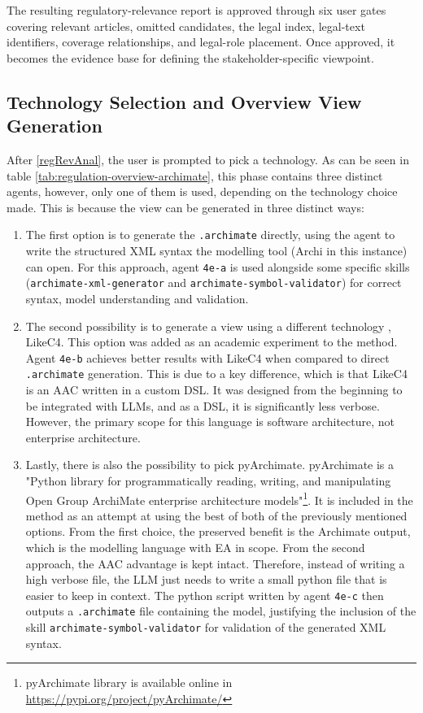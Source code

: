 The resulting regulatory-relevance report is approved through six user gates covering relevant articles, omitted candidates, the legal index, legal-text identifiers, coverage relationships, and legal-role placement. Once approved, it becomes the evidence base for defining the stakeholder-specific viewpoint.

\subsection{Technology Selection and Overview View Generation}
\label{techSelect}

After \ref{regRevAnal}, the user is prompted to pick a technology. As can be seen in table \ref{tab:regulation-overview-archimate},
this phase contains three distinct agents, however, only one of them is used, depending on the technology choice made. This is because the view can be generated in three distinct ways:

\begin{enumerate}
    \item The first option is to generate the \texttt{.archimate} directly, using the agent to write the structured \ac{XML} syntax the modelling tool (Archi in this instance) can open. For this approach, agent \texttt{4e-a} is used alongside some specific skills (\texttt{archimate-xml-generator} and \texttt{archimate-symbol-validator}) for correct syntax, model understanding and validation.
    \item The second possibility is to generate a view using a different technology , LikeC4. This option was added as an academic experiment to the method. Agent \texttt{4e-b} achieves better results with LikeC4 when compared to direct \texttt{.archimate} generation. This is due to a key difference, which is that LikeC4 is an \ac{AAC} written in a custom \ac{DSL}. It was designed from the beginning to be integrated with \ac{LLM}s, and as a \ac{DSL}, it is significantly less verbose. However, the primary scope for this language is software architecture, not enterprise architecture.
    \item Lastly, there is also the possibility to pick pyArchimate. pyArchimate is a "Python library for programmatically reading, writing, and manipulating Open Group ArchiMate enterprise architecture models"\footnote{\label{fn:pyArchimate}pyArchimate library is available online in \url{https://pypi.org/project/pyArchimate/}}. It is included in the method as an attempt at using the best of both of the previously mentioned options. From the first choice, the preserved benefit is the Archimate output, which is the modelling language with \ac{EA} in scope. From the second approach, the \ac{AAC} advantage is kept intact. Therefore, instead of writing a high verbose file, the \ac{LLM} just needs to write a small python file that is easier to keep in context. The python script written by agent \texttt{4e-c} then outputs a \texttt{.archimate} file containing the model, justifying the inclusion of the skill \texttt{archimate-symbol-validator} for validation of the generated \ac{XML} syntax. 
\end{enumerate}

